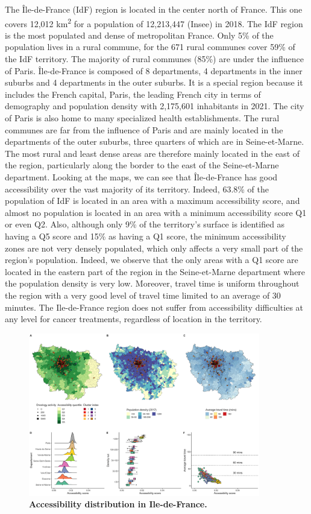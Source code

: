 The Île-de-France (IdF) region is located in the center north of France. This
one covers 12,012 km\textsuperscript{2} for a population of 12,213,447 (Insee)
in 2018. The IdF region is the most populated and dense of metropolitan France.
Only 5\% of the population lives in a rural commune, for the 671 rural communes
cover 59\% of the IdF territory. The majority of rural communes (85\%) are under
the influence of Paris. Île-de-France is composed of 8 departments, 4
departments in the inner suburbs and 4 departments in the outer suburbs. It is a
special region because it includes the French capital, Paris, the leading French
city in terms of demography and population density with 2,175,601 inhabitants in
2021. The city of Paris is also home to many specialized health establishments.
The rural communes are far from the influence of Paris and are mainly located in
the departments of the outer suburbs, three quarters of which are in
Seine-et-Marne. The most rural and least dense areas are therefore mainly
located in the east of the region, particularly along the border to the east of
the Seine-et-Marne department. Looking at the maps, we can see that
Île-de-France has good accessibility over the vast majority of its territory.
Indeed, 63.8\% of the population of IdF is located in an area with a maximum
accessibility score, and almost no population is located in an area with a
minimum accessibility score Q1 or even Q2. Also, although only 9\% of the
territory's surface is identified as having a Q5 score and 15\% as having a Q1
score, the minimum accessibility zones are not very densely populated, which
only affects a very small part of the region's population.
Indeed, we observe that the only areas with a Q1 score are located in the
eastern part of the region in the Seine-et-Marne department where the population
density is very low. Moreover, travel time is uniform throughout the region with
a very good level of travel time limited to an average of 30 minutes. The
Ile-de-France region does not suffer from accessibility difficulties at any
level for cancer treatments, regardless of location in the territory.

\begin{figure}[H]
    \includegraphics[width=0.9\textwidth]{images/camion/region_accessibility/accessibility_Ile-de-France.png}
    \centering
    \caption{
        \textbf{Accessibility distribution in Ile-de-France.}
    }
\end{figure}

